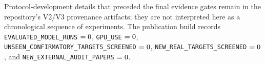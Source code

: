 \documentclass[10pt]{article}
\begin{document}
Protocol-development details that preceded the final evidence gates remain in
the repository's V2/V3 provenance artifacts; they are not interpreted here as
a chronological sequence of experiments.  The publication build records
\texttt{EVALUATED\_MODEL\_RUNS} \(=0\),
\texttt{GPU\_USE} \(=0\),
\texttt{UNSEEN\_CONFIRMATORY\_TARGETS\_SCREENED}
\(=0\),
\texttt{NEW\_REAL\_TARGETS\_SCREENED} \(=0\), and
\texttt{NEW\_EXTERNAL\_AUDIT\_PAPERS} \(=0\).



\end{document}
